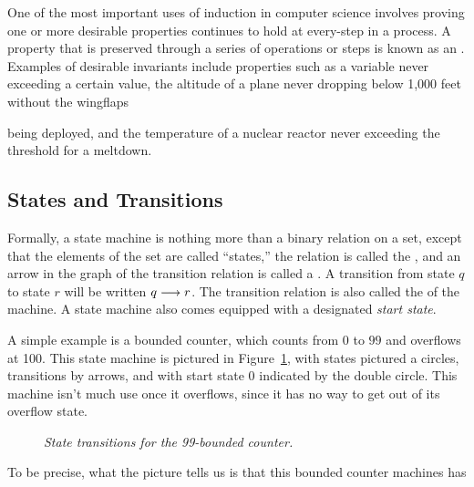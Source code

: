 \iffalse
You may already have seen them in a digital logic course,
a compiler course, or a probability course.
\fi

One of the most important uses of induction in computer science
involves proving one or more desirable properties continues to hold at
every-step in a process.  A property that is preserved through a
series of operations or steps is known as an .
Examples of desirable invariants include properties such as a variable
never exceeding a certain value, the altitude of a plane never
dropping below 1,000 feet without the wingflaps
\iffalse and landing gear\fi
being deployed, and the temperature of a nuclear reactor never
exceeding the threshold for a meltdown.

\iffalse  %
In particular, we show that the proposition is true at the beginning
(this is the base case) and that if it is true after $t$ steps have
been taken, it will also be true after step~$t + 1$ (this is the
inductive step).  We can then use the induction principle to conclude
that the proposition is indeed an invariant, namely, that it will
always hold.
\fi

\subsection{States and Transitions}

Formally, a state machine is nothing more than a binary relation on a
set, except that the elements of the set are called ``states,'' the
relation is called the , and an arrow in the
graph of the transition relation is called a .  A
transition from state $q$ to state $r$ will be written $q \mathrel{\longrightarrow} r$.
The transition relation is also called the  of the
machine.  A state machine also comes equipped with a designated
\emph{start state}.

A simple example is a bounded counter, which counts from $0$ to $99$
and overflows at 100.  This state machine is pictured in
Figure~\ref{fig:counter}, with states pictured a circles, transitions
by arrows, and with start state 0 indicated by the double circle.
This machine isn't much use once it overflows, since it has no way to
get out of its overflow state.
\begin{figure}
\caption{\em State transitions for the 99-bounded counter.}
\label{fig:counter}
\end{figure}
To be precise, what the picture tells us is that this bounded counter machines has

